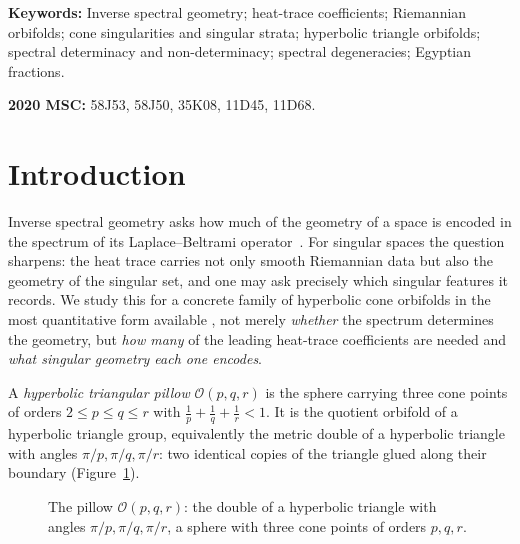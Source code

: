 \documentclass[12pt, letterpaper]{article}
\theoremstyle{definition}
\theoremstyle{plain}
\begin{document}
\vspace{0.8cm}
\noindent\textbf{Keywords:} Inverse spectral geometry; heat-trace coefficients; Riemannian orbifolds; cone singularities and singular strata; hyperbolic triangle orbifolds; spectral determinacy and non-determinacy; spectral degeneracies; Egyptian fractions.

\smallskip
\noindent\textbf{2020 MSC:} 58J53, 58J50, 35K08, 11D45, 11D68.

\newpage
\tableofcontents
\newpage


\section{Introduction}
\label{sec:intro}

Inverse spectral geometry asks how much of the geometry of a space is encoded in the spectrum of its Laplace--Beltrami operator~\cite{kac1966}. For singular spaces the question sharpens: the heat trace carries not only smooth Riemannian data but also the geometry of the singular set, and one may ask precisely which singular features it records. We study this for a concrete family of hyperbolic cone orbifolds in the most quantitative form available ,  not merely \emph{whether} the spectrum determines the geometry, but \emph{how many} of the leading heat-trace coefficients are needed and \emph{what singular geometry each one encodes}.

A \emph{hyperbolic triangular pillow} $\mathcal{O}(p,q,r)$ is the sphere carrying three cone points of orders $2\le p\le q\le r$ with $\tfrac1p+\tfrac1q+\tfrac1r<1$. It is the quotient orbifold of a hyperbolic triangle group, equivalently the metric double of a hyperbolic triangle with angles $\pi/p,\pi/q,\pi/r$: two identical copies of the triangle glued along their boundary (Figure~\ref{fig:pillow}).

\begin{figure}[h!]
    \centering
    \caption{The pillow $\mathcal{O}(p,q,r)$: the double of a hyperbolic triangle with angles $\pi/p,\pi/q,\pi/r$, a sphere with three cone points of orders $p,q,r$.}
    \label{fig:pillow}
\end{figure}
\end{document}
